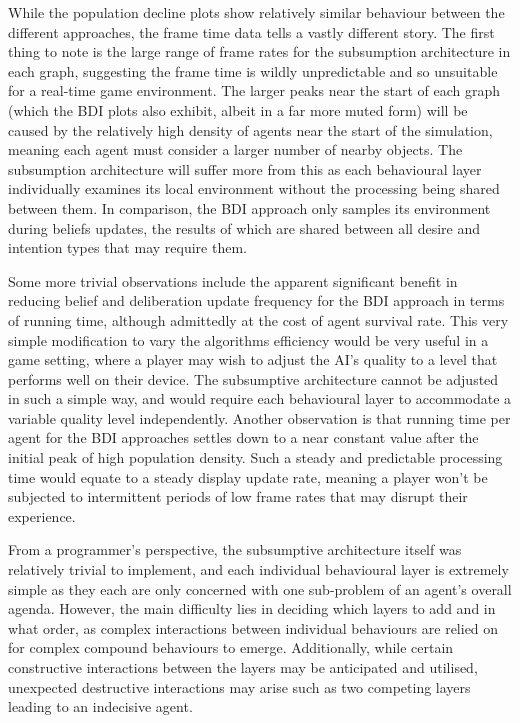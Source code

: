 \documentclass[12pt,a4paper]{article}
\begin{document}
While the population decline plots show relatively similar behaviour between the different approaches, the frame time data tells a vastly different story. The first thing to note is the large range of frame rates for the subsumption architecture in each graph, suggesting the frame time is wildly unpredictable and so unsuitable for a real-time game environment. The larger peaks near the start of each graph (which the BDI plots also exhibit, albeit in a far more muted form) will be caused by the relatively high density of agents near the start of the simulation, meaning each agent must consider a larger number of nearby objects. The subsumption architecture will suffer more from this as each behavioural layer individually examines its local environment without the processing being shared between them. In comparison, the BDI approach only samples its environment during beliefs updates, the results of which are shared between all desire and intention types that may require them.

Some more trivial observations include the apparent significant benefit in reducing belief and deliberation update frequency for the BDI approach in terms of running time, although admittedly at the cost of agent survival rate. This very simple modification to vary the algorithms efficiency would be very useful in a game setting, where a player may wish to adjust the AI's quality to a level that performs well on their device. The subsumptive architecture cannot be adjusted in such a simple way, and would require each behavioural layer to accommodate a variable quality level independently. Another observation is that running time per agent for the BDI approaches settles down to a near constant value after the initial peak of high population density. Such a steady and predictable processing time would equate to a steady display update rate, meaning a player won't be subjected to intermittent periods of low frame rates that may disrupt their experience.

From a programmer's perspective, the subsumptive architecture itself was relatively trivial to implement, and each individual behavioural layer is extremely simple as they each are only concerned with one sub-problem of an agent's overall agenda. However, the main difficulty lies in deciding which layers to add and in what order, as complex interactions between individual behaviours are relied on for complex compound behaviours to emerge. Additionally, while certain constructive interactions between the layers may be anticipated and utilised, unexpected destructive interactions may arise such as two competing layers leading to an indecisive agent.
\end{document}
